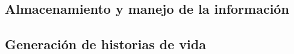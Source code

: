 		
	

\subsection{Almacenamiento y manejo de la información}

\subsection{Generación de historias de vida}